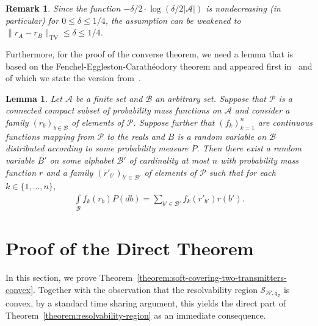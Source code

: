 \documentclass[journal]{IEEEtran}
\newcommand{\lemmaconst}{\delta}
\newcommand{\channelpmf}{q}
\newcommand{\generalpmf}{r}
\newcommand{\generalrvOne}{A}
\newcommand{\generalrvOneAlph}{\mathcal{A}}
\newcommand{\generalrvTwo}{B}
\newcommand{\generalrvTwoValue}{b}
\newcommand{\generalrvTwoAlph}{\mathcal{B}}
\newcommand{\generalpmfset}{\mathcal{P}}
\newcommand{\generaldimension}{n}
\newcommand{\generaldimensionIndex}{k}
\newcommand{\generalfunction}{f}
\newcommand{\generalpmeasure}{P}
\newcommand{\channelOut}{Z}
\newcommand{\channel}{\mathcal{W}}
\newcommand{\totalvariation}[1]{\lVert #1 \rVert_\mathrm{TV}}
\newcommand{\cardinality}[1]{\lvert #1 \rvert}
\newcommand{\capacityRegion}[2]{\mathcal{S}_{#1, #2}}
\newtheorem{lemma}{Lemma}
\newtheorem{remark}{Remark}
\begin{document}
\begin{remark}
Since the function $-\lemmaconst/2 \cdot \log (\lemmaconst/2\cardinality{\generalrvOneAlph})$ is nondecreasing (in particular) for $0 \leq \lemmaconst \leq 1/4$, the assumption can be weakened to $\totalvariation{\generalpmf_\generalrvOne - \generalpmf_\generalrvTwo} \leq \lemmaconst \leq 1/4$.
\end{remark}
Furthermore, for the proof of the converse theorem, we need a lemma that is based on the Fenchel-Eggleston-Carathéodory theorem and appeared first in~\cite{AhlswedeSource} and of which we state the version from~\cite[Appendix C]{ElGamalNetworkIT}.
\begin{lemma}
\label{convex-cover-lemma}
Let $\generalrvOneAlph$ be a finite set and $\generalrvTwoAlph$ an arbitrary set. Suppose that $\generalpmfset$ is a connected compact subset of probability mass functions on $\generalrvOneAlph$ and consider a family $(\generalpmf_\generalrvTwoValue)_{\generalrvTwoValue \in \generalrvTwoAlph}$ of elements of $\generalpmfset$. Suppose further that $(\generalfunction_\generaldimensionIndex)_{\generaldimensionIndex=1}^\generaldimension$ are continuous functions mapping from $\generalpmfset$ to the reals and $\generalrvTwo$ is a random variable on $\generalrvTwoAlph$ distributed according to some probability measure $\generalpmeasure$. Then there exist a random variable $\generalrvTwo'$ on some alphabet $\generalrvTwoAlph'$ of cardinality at most $\generaldimension$ with probability mass function $\generalpmf$ and a family $(\generalpmf'_{\generalrvTwoValue'})_{\generalrvTwoValue' \in \generalrvTwoAlph'}$ of elements of $\generalpmfset$ such that for each $\generaldimensionIndex \in \{1, \dots, \generaldimension\}$,
\begin{align}
\label{convex-cover-lemma-function-property}
\int\limits_\generalrvTwoAlph
  \generalfunction_\generaldimensionIndex(\generalpmf_\generalrvTwoValue)
\generalpmeasure(d\generalrvTwoValue)
=
\sum\limits_{\generalrvTwoValue' \in \generalrvTwoAlph'}
  \generalfunction_\generaldimensionIndex(\generalpmf'_{\generalrvTwoValue'})
  \generalpmf(\generalrvTwoValue').
\end{align}
\end{lemma}


\section{Proof of the Direct Theorem}
\label{sec:main}
In this section, we prove Theorem~\ref{theorem:soft-covering-two-transmitters-convex}. Together with the observation that the resolvability region $\capacityRegion{\channel}{\channelpmf_\channelOut}$ is convex, by a standard time sharing argument, this yields the direct part of Theorem~\ref{theorem:resolvability-region} as an immediate consequence.
\end{document}
